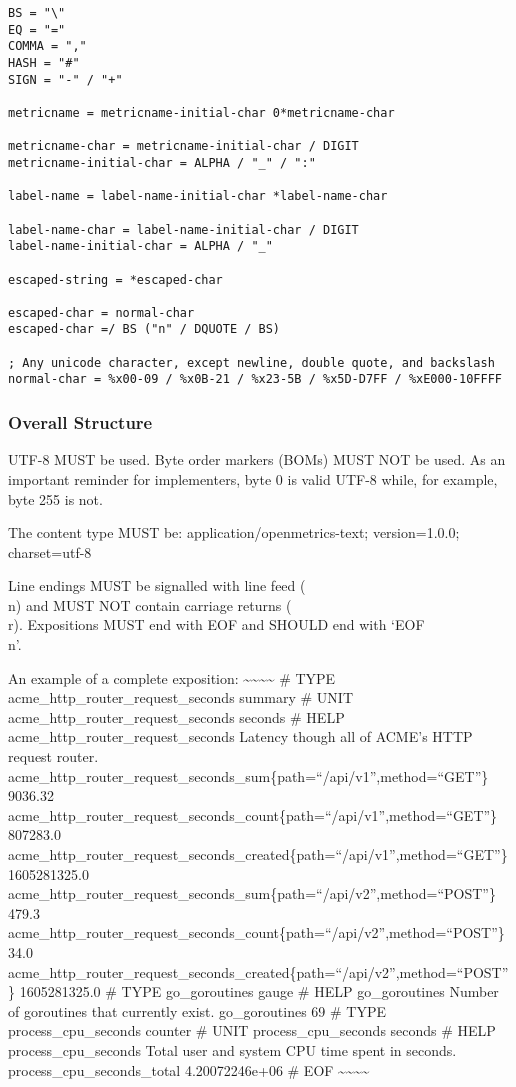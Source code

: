 \documentclass[a4paper,12pt,notitlepage,twoside,openright]{article}
\begin{document}
\begin{verbatim}
BS = "\"
EQ = "="
COMMA = ","
HASH = "#"
SIGN = "-" / "+"

metricname = metricname-initial-char 0*metricname-char

metricname-char = metricname-initial-char / DIGIT
metricname-initial-char = ALPHA / "_" / ":"

label-name = label-name-initial-char *label-name-char

label-name-char = label-name-initial-char / DIGIT
label-name-initial-char = ALPHA / "_"

escaped-string = *escaped-char

escaped-char = normal-char
escaped-char =/ BS ("n" / DQUOTE / BS)

; Any unicode character, except newline, double quote, and backslash
normal-char = %x00-09 / %x0B-21 / %x23-5B / %x5D-D7FF / %xE000-10FFFF
\end{verbatim}

\hypertarget{overall-structure}{%
\subsubsection{Overall Structure}\label{overall-structure}}

UTF-8 MUST be used. Byte order markers (BOMs) MUST NOT be used. As an
important reminder for implementers, byte 0 is valid UTF-8 while, for
example, byte 255 is not.

The content type MUST be: application/openmetrics-text; version=1.0.0;
charset=utf-8

Line endings MUST be signalled with line feed (\\n) and MUST NOT contain
carriage returns (\\r). Expositions MUST end with EOF and SHOULD end with
`EOF\\n'.

An example of a complete exposition:
\textasciitilde\textasciitilde\textasciitilde\textasciitilde{} \# TYPE
acme\_http\_router\_request\_seconds summary \# UNIT
acme\_http\_router\_request\_seconds seconds \# HELP
acme\_http\_router\_request\_seconds Latency though all of ACME's HTTP
request router.
acme\_http\_router\_request\_seconds\_sum\{path=``/api/v1'',method=``GET''\}
9036.32
acme\_http\_router\_request\_seconds\_count\{path=``/api/v1'',method=``GET''\}
807283.0
acme\_http\_router\_request\_seconds\_created\{path=``/api/v1'',method=``GET''\}
1605281325.0
acme\_http\_router\_request\_seconds\_sum\{path=``/api/v2'',method=``POST''\}
479.3
acme\_http\_router\_request\_seconds\_count\{path=``/api/v2'',method=``POST''\}
34.0
acme\_http\_router\_request\_seconds\_created\{path=``/api/v2'',method=``POST''\}
1605281325.0 \# TYPE go\_goroutines gauge \# HELP go\_goroutines Number
of goroutines that currently exist. go\_goroutines 69 \# TYPE
process\_cpu\_seconds counter \# UNIT process\_cpu\_seconds seconds \#
HELP process\_cpu\_seconds Total user and system CPU time spent in
seconds. process\_cpu\_seconds\_total 4.20072246e+06 \# EOF
\textasciitilde\textasciitilde\textasciitilde\textasciitilde{}
\end{document}
